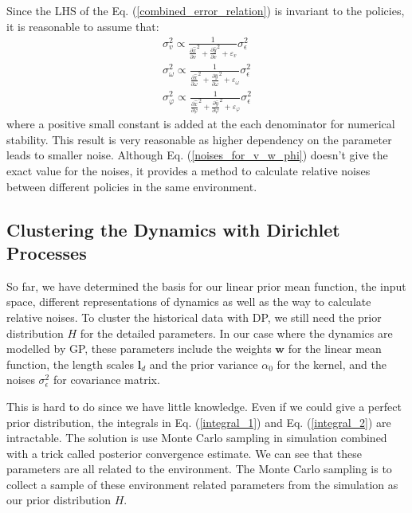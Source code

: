 \documentclass[journal]{IEEEtran}
\begin{document}
Since the LHS of the Eq. (\ref{combined_error_relation}) is invariant to the policies, it is reasonable to assume that:
\begin{equation}
\begin{gathered}
\sigma_v^2 \propto
\frac{1}{
\frac{\partial \hat{x}}{\partial v}^2 
+ \frac{\partial \hat{y}}{\partial v}^2 + \varepsilon_v} \sigma_{\epsilon}^2
\\
\sigma_{\omega}^2 \propto
\frac{1}{
\frac{\partial \hat{x}}{\partial \omega}^2
+
\frac{\partial \hat{y}}{\partial \omega}^2 + \varepsilon_{\omega}} \sigma_{\epsilon}^2
\\
\sigma_{\varphi}^2 \propto
\frac{1}{
\frac{\partial \hat{x}}{\partial \varphi}^2
+ 
\frac{\partial \hat{y}}{\partial \varphi}^2 + \varepsilon_{\varphi}} \sigma_{\epsilon}^2
\end{gathered}
\label{noises_for_v_w_phi}
\end{equation}
where a positive small constant is added at the each denominator for numerical stability.
This result is very reasonable as higher dependency on the parameter leads to smaller noise.
Although Eq. (\ref{noises_for_v_w_phi}) doesn't give the exact value for the noises, it provides a method to calculate relative noises between different policies in the same environment.



\subsection{Clustering the Dynamics with Dirichlet Processes}
So far, we have determined the basis for our linear prior mean function, the input space, different representations of dynamics as well as the way to calculate relative noises.
To cluster the historical data with DP, we still need the prior distribution $H$ for the detailed parameters. 
In our case where the dynamics are modelled by GP, these parameters include the weights $\bm{w}$ for the linear mean function, the length scales $\bm{l}_d$ and the prior variance $\alpha_0$ for the kernel, and the noises $\sigma_{\epsilon}^2$ for covariance matrix.


This is hard to do since we have little knowledge.
Even if we could give a perfect prior distribution, the integrals in Eq. (\ref{integral_1}) and Eq. (\ref{integral_2}) are intractable.
The solution is use Monte Carlo sampling in simulation combined with a trick called posterior convergence estimate.
We can see that these parameters are all related to the environment.
The Monte Carlo sampling is to collect a sample of these environment related parameters from the simulation as our prior distribution $H$.
\end{document}
